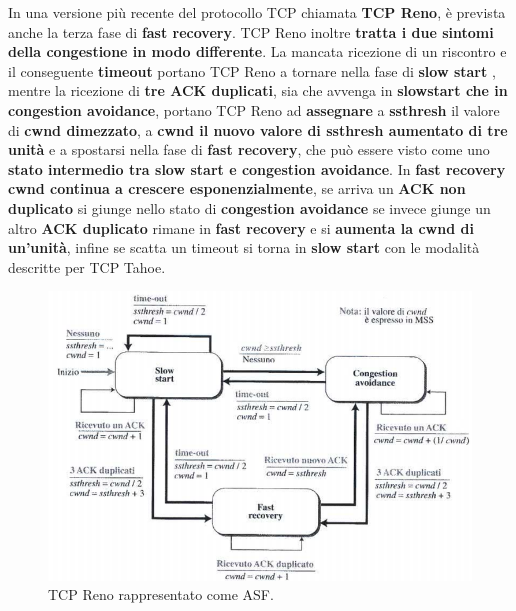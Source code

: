 \documentclass[11pt,a4paper,oneside]{book}
\theoremstyle{definition}
\begin{document}
\pagebreak

In una versione più recente del protocollo TCP chiamata \textbf{TCP Reno}, è prevista anche la terza fase di \textbf{fast recovery}. TCP Reno inoltre \textbf{tratta i due sintomi della congestione in modo differente}. La mancata ricezione di un riscontro e il conseguente \textbf{timeout} portano TCP Reno a tornare nella fase di \textbf{slow start }, mentre la ricezione di \textbf{tre ACK duplicati}, sia che avvenga in \textbf{slowstart che in congestion avoidance}, portano TCP Reno ad \textbf{assegnare} a \textbf{ssthresh} il valore di \textbf{cwnd dimezzato}, a \textbf{cwnd il nuovo valore di ssthresh aumentato di tre unità} e a spostarsi nella fase di \textbf{fast recovery}, che può essere visto come uno \textbf{stato intermedio tra slow start e congestion avoidance}. In \textbf{fast recovery cwnd continua a crescere esponenzialmente}, se arriva un \textbf{ACK non duplicato} si giunge nello stato di \textbf{congestion avoidance} se invece giunge un altro \textbf{ACK duplicato} rimane in \textbf{fast recovery} e si \textbf{aumenta la cwnd di un'unità}, infine se scatta un timeout si torna in \textbf{slow start} con le modalità descritte per TCP Tahoe.
\begin{figure}[!h]
	\includegraphics[scale=0.33]{Immagini/Reno.png}
	\centering
	\caption{TCP Reno rappresentato come ASF.}
\end{figure}
\end{document}

